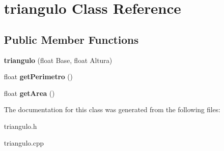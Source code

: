 \hypertarget{classtriangulo}{}\section{triangulo Class Reference}
\label{classtriangulo}
\subsection*{Public Member Functions}
\begin{DoxyCompactItemize}
\item 
\mbox{\label{classtriangulo_ae0fc3ebd92250ab83327de75c474fd98}} 
{\bfseries triangulo} (float Base, float Altura)
\item 
\mbox{\label{classtriangulo_a473de9df3b8888c11d430ad2797024d8}} 
float {\bfseries get\+Perimetro} ()
\item 
\mbox{\label{classtriangulo_a9e0460d41e519fc931735f4ed2811b37}} 
float {\bfseries get\+Area} ()
\end{DoxyCompactItemize}


The documentation for this class was generated from the following files\+:\begin{DoxyCompactItemize}
\item 
triangulo.\+h\item 
triangulo.\+cpp\end{DoxyCompactItemize}
